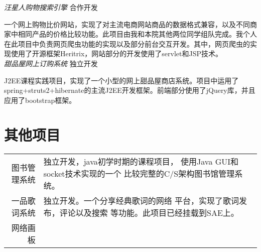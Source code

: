 \documentclass[10pt]{article} %
\begin{document}
{\begin{minipage}[t]{0.5\textwidth}

{\large \textit{汪星人购物搜索引擎}} \hfill  \hfill {\textsc{合作开发}\\}

\normalsize{一个网上购物比价网站，实现了对主流电商网站商品的数据格式兼容，以及不同商家中相同产品的价格比较功能。此项目由我和本院其他两位同学组队完成。我个人在此项目中负责网页爬虫功能的实现以及部分前台交互开发。其中，网页爬虫的实现使用了开源框架Heritrix，网站部分的开发使用了servlet和JSP技术。}\\


{\large \textit{甜品屋网上订购系统}} \hfill  \hfill {\textsc{独立开发}\\}

\normalsize{J2EE课程实践项目，实现了一个小型的网上甜品屋商店系统。项目中运用了spring+struts2+hibernate的主流J2EE开发框架。前端部分使用了jQuery库，并且应用了bootstrap框架。}\\



\section{其他项目} 

\begin{tabular}{rl}
     图书管理系统 & 
     \begin{minipage}[t]{0.72\textwidth}
     独立开发，java初学时期的课程项目，
     使用Java GUI和socket技术实现的一个
     比较完整的C/S架构图书馆管理系统。
     \end{minipage}
     \\
     一品歌词系统 & 
     \begin{minipage}[t]{0.72\textwidth}
     独立开发。一个分享经典歌词的网络
     平台，实现了歌词发布，评论以及搜索
     等功能。此项目已经挂载到SAE上。
     \end{minipage}
     \\
     网络画板     & 
     \begin{minipage}[t]{0.72\textwidth}


\end{minipage}
\end{tabular}
\end{minipage}}
\end{document}
